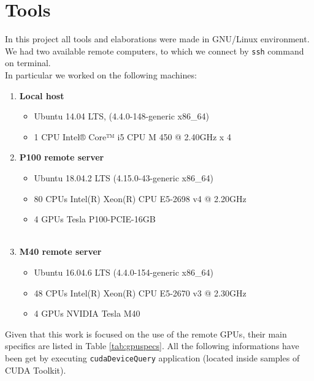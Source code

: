 \chapter{Tools} \label{chap:tools}

In this project all tools and elaborations were made in GNU/Linux environment.
We had two available remote computers, to which we connect by \texttt{ssh} command on terminal.\\
In particular we worked on the following machines:
	\begin{enumerate}
		\item \textbf{Local host}
		\begin{itemize} 
			\item Ubuntu 14.04 LTS, (4.4.0-148-generic x86\_64)
			\item 1 CPU Intel® Core™ i5 CPU M 450 @ 2.40GHz x 4 
		\end{itemize}
		
		\item \textbf{P100 remote server}
		\begin{itemize}
			\item Ubuntu 18.04.2 LTS (4.15.0-43-generic x86\_64)	
			\item 80 CPUs Intel(R) Xeon(R) CPU E5-2698 v4 @ 2.20GHz		
			\item 4 GPUs Tesla P100-PCIE-16GB\\\\
		\end{itemize}
		 
		\item\textbf{ M40 remote server}
		\begin{itemize}
			\item Ubuntu 16.04.6 LTS (4.4.0-154-generic x86\_64)
			\item 48 CPUs Intel(R) Xeon(R) CPU E5-2670 v3 @ 2.30GHz
			\item 4 GPUs NVIDIA Tesla M40\\
		\end{itemize}
	\end{enumerate}
	Given that this work is focused on the use of the remote GPUs, their main specifics are listed in Table \ref{tab:gpuspecs}. All the following informations have been get by executing \texttt{cudaDeviceQuery} application (located inside samples of CUDA Toolkit).\\
